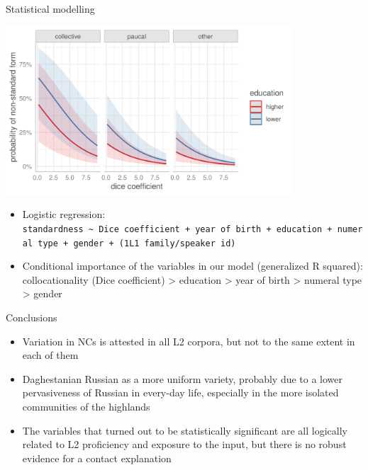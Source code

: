 \documentclass[
  ignorenonframetext,
  t]{beamer}
\providecommand{\tightlist}{%
  \setlength{\itemsep}{0pt}\setlength{\parskip}{0pt}}\usepackage{longtable,booktabs,array}
\begin{document}
\begin{frame}[fragile]{Statistical modelling}
\label{statistical-modelling}
\begin{center}
\includegraphics[width=0.8\textwidth,height=\textheight]{images/l2_num_constr_model_prediction_by_dice_coefficient_education_num_type.png}
\end{center}

\begin{itemize}
\tightlist
\item
  Logistic regression:
  \small \texttt{standardness\ \textasciitilde{}\ Dice\ coefficient\ +\ year\ of\ birth\ +\ education\ +\ numeral\ type\ +\ gender\ +\ (1\textbar{}L1\ family/speaker\ id)}
  \normalsize
\item
  Conditional importance of the variables in our model (generalized R
  squared): collocationality (Dice coefficient) \textgreater{} education
  \textgreater{} year of birth \textgreater{} numeral type
  \textgreater{} gender
\end{itemize}
\end{frame}

\begin{frame}{Conclusions}
\label{conclusions}
\begin{itemize}
\tightlist
\item
  Variation in NCs is attested in all L2 corpora, but not to the same
  extent in each of them
\item
  Daghestanian Russian as a more uniform variety, probably due to a
  lower pervasiveness of Russian in every-day life, especially in the
  more isolated communities of the highlands
\item
  The variables that turned out to be statistically significant are all
  logically related to L2 proficiency and exposure to the input, but
  there is no robust evidence for a contact explanation
\end{itemize}
\end{frame}
\end{document}
